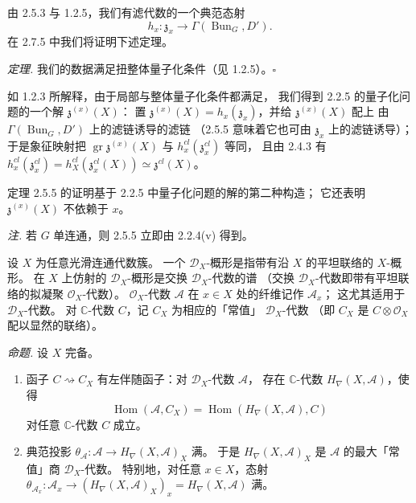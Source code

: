  由 2.5.3 与 1.2.5，我们有滤代数的一个典范态射
\[
h_x: \mathfrak{z}_x\to\Gamma(\operatorname{Bun}_G,D').
\]
在 2.7.5 中我们将证明下述定理。

\emph{定理.} 我们的数据满足扭整体量子化条件（见 1.2.5）。\hfill$\square$

如 1.2.3 所解释，由于局部与整体量子化条件都满足，
我们得到 2.2.5 的量子化问题的一个解 $\mathfrak{z}^{(x)}(X)$：
置 $\mathfrak{z}^{(x)}(X)=h_x(\mathfrak{z}_x)$，并给 $\mathfrak{z}^{(x)}(X)$ 配上
由 $\Gamma(\operatorname{Bun}_G,D')$ 上的滤链诱导的滤链
（2.5.5 意味着它也可由 $\mathfrak{z}_x$ 上的滤链诱导）；
于是象征映射把 $\operatorname{gr}\mathfrak{z}^{(x)}(X)$ 与 $h_x^{cl}(\mathfrak{z}^{cl}_x)$ 等同，
且由 2.4.3 有
$h_x^{cl}(\mathfrak{z}^{cl}_x)=h_X^{cl}(\mathfrak{z}^{cl}_x(X))\simeq\mathfrak{z}^{cl}(X)$。

定理 2.5.5 的证明基于 2.2.5 中量子化问题的解的第二种构造；
它还表明 $\mathfrak{z}^{(x)}(X)$ 不依赖于 $x$。

\emph{注.} 若 $G$ 单连通，则 2.5.5 立即由 2.2.4(v) 得到。


 设 $X$ 为任意光滑连通代数簇。
一个 $\mathcal{D}_X$-概形是指带有沿 $X$ 的平坦联络的 $X$-概形。
在 $X$ 上仿射的 $\mathcal{D}_X$-概形是交换 $\mathcal{D}_X$-代数的谱
（交换 $\mathcal{D}_X$-代数即带有平坦联络的拟凝聚 $\mathcal{O}_X$-代数）。
$\mathcal{O}_X$-代数 $\mathcal{A}$ 在 $x\in X$ 处的纤维记作 $\mathcal{A}_x$；
这尤其适用于 $\mathcal{D}_X$-代数。
对 $\mathbb{C}$-代数 $C$，记 $C_X$ 为相应的「常值」 $\mathcal{D}_X$-代数
（即 $C_X$ 是 $C\otimes\mathcal{O}_X$ 配以显然的联络）。

\emph{命题.} 设 $X$ 完备。
\begin{enumerate}[label=(\roman*),leftmargin=2.2em]
\item 函子 $C\rightsquigarrow C_X$ 有左伴随函子：对 $\mathcal{D}_X$-代数 $\mathcal{A}$，
  存在 $\mathbb{C}$-代数 $H_\nabla(X,\mathcal{A})$，使得
  \begin{equation}\tag{22}
  \operatorname{Hom}(\mathcal{A},C_X)=\operatorname{Hom}(H_\nabla(X,\mathcal{A}),C)
  \end{equation}
  对任意 $\mathbb{C}$-代数 $C$ 成立。
\item 典范投影 $\theta_{\mathcal{A}}: \mathcal{A}\to H_\nabla(X,\mathcal{A})_X$ 满。
  于是 $H_\nabla(X,\mathcal{A})_X$ 是 $\mathcal{A}$ 的最大「常值」商 $\mathcal{D}_X$-代数。
  特别地，对任意 $x\in X$，态射
  $\theta_{\mathcal{A}_x}: \mathcal{A}_x\to(H_\nabla(X,\mathcal{A})_X)_x=H_\nabla(X,\mathcal{A})$ 满。
\end{enumerate}

